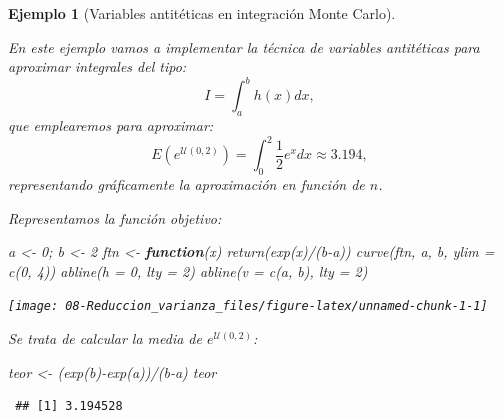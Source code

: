 \documentclass[
]{book}
\newenvironment{Shaded}{\begin{snugshade}}{\end{snugshade}}
\newcommand{\AttributeTok}[1]{\textcolor[rgb]{0.77,0.63,0.00}{#1}}
\newcommand{\ControlFlowTok}[1]{\textcolor[rgb]{0.13,0.29,0.53}{\textbf{#1}}}
\newcommand{\DecValTok}[1]{\textcolor[rgb]{0.00,0.00,0.81}{#1}}
\newcommand{\FunctionTok}[1]{\textcolor[rgb]{0.00,0.00,0.00}{#1}}
\newcommand{\NormalTok}[1]{#1}
\newcommand{\OtherTok}[1]{\textcolor[rgb]{0.56,0.35,0.01}{#1}}
\newcommand{\SpecialCharTok}[1]{\textcolor[rgb]{0.00,0.00,0.00}{#1}}
\theoremstyle{break}
\newtheorem{example}{Ejemplo}[chapter]
\theoremstyle{nonumberplain}
\begin{document}
\begin{example}[Variables antitéticas en integración Monte Carlo]
\protect\hypertarget{exm:integrala}{}\label{exm:integrala}

En este ejemplo vamos a implementar la técnica de variables antitéticas para aproximar integrales del tipo:
\[I=\int_{a}^{b}h\left(  x\right)  dx,\]
que emplearemos para aproximar:
\[E\left(  e^{\mathcal{U}(0,2)}\right)  =\int_{0}^{2}\frac{1}{2}e^{x}dx \approx 3.194,\]
representando gráficamente la aproximación en función de \(n\).

Representamos la función objetivo:

\begin{Shaded}
\begin{Highlighting}[]
\NormalTok{a }\OtherTok{\textless{}{-}} \DecValTok{0}\NormalTok{; b }\OtherTok{\textless{}{-}} \DecValTok{2}
\NormalTok{ftn }\OtherTok{\textless{}{-}} \ControlFlowTok{function}\NormalTok{(x) }\FunctionTok{return}\NormalTok{(}\FunctionTok{exp}\NormalTok{(x)}\SpecialCharTok{/}\NormalTok{(b}\SpecialCharTok{{-}}\NormalTok{a))}
\FunctionTok{curve}\NormalTok{(ftn, a, b, }\AttributeTok{ylim =} \FunctionTok{c}\NormalTok{(}\DecValTok{0}\NormalTok{, }\DecValTok{4}\NormalTok{))}
\FunctionTok{abline}\NormalTok{(}\AttributeTok{h =} \DecValTok{0}\NormalTok{, }\AttributeTok{lty =} \DecValTok{2}\NormalTok{)}
\FunctionTok{abline}\NormalTok{(}\AttributeTok{v =} \FunctionTok{c}\NormalTok{(a, b), }\AttributeTok{lty =} \DecValTok{2}\NormalTok{)}
\end{Highlighting}
\end{Shaded}

\begin{center}\texttt{[image: 08-Reduccion\_varianza\_files/figure-latex/unnamed-chunk-1-1]} \end{center}

Se trata de calcular la media de \(e^{\mathcal{U}(0,2)}\):

\begin{Shaded}
\begin{Highlighting}[]
\NormalTok{teor }\OtherTok{\textless{}{-}}\NormalTok{ (}\FunctionTok{exp}\NormalTok{(b)}\SpecialCharTok{{-}}\FunctionTok{exp}\NormalTok{(a))}\SpecialCharTok{/}\NormalTok{(b}\SpecialCharTok{{-}}\NormalTok{a)}
\NormalTok{teor}
\end{Highlighting}
\end{Shaded}

\begin{verbatim}
 ## [1] 3.194528
\end{verbatim}


\end{example}
\end{document}
